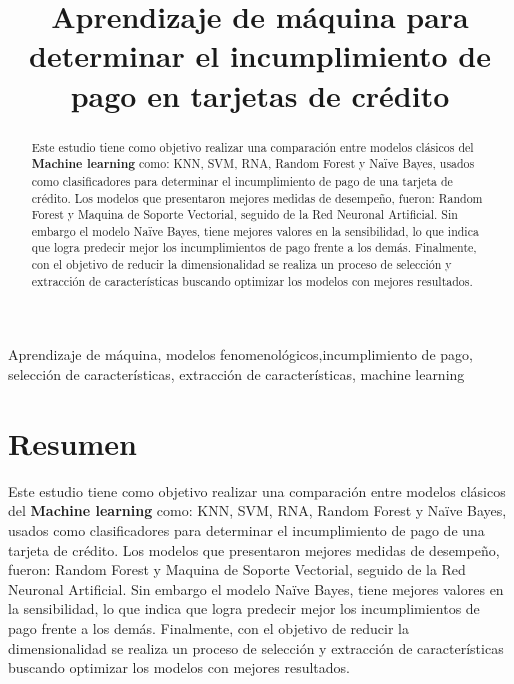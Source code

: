 \documentclass[conference]{IEEEtran}
\begin{document}
\title{Aprendizaje de máquina para determinar el incumplimiento de pago en tarjetas de crédito
}
\author{
\and
{}
}

\maketitle

\begin{abstract}
Este estudio tiene como objetivo realizar una comparación entre modelos clásicos del \textbf{Machine learning} como: KNN, SVM, RNA, Random Forest y Naïve Bayes, usados como clasificadores para determinar el incumplimiento de pago de una tarjeta de crédito. 
Los modelos que presentaron mejores medidas de desempeño, fueron: Random Forest y Maquina de Soporte Vectorial, seguido de la Red Neuronal Artificial. Sin embargo el modelo Naïve Bayes, tiene mejores valores en la sensibilidad, lo que indica que logra predecir mejor los incumplimientos de pago frente a los demás. Finalmente, con el objetivo de reducir la dimensionalidad se realiza un proceso de selección y extracción de características buscando optimizar los modelos con mejores resultados.
\end{abstract}

\hfill
 
\begin{IEEEkeywords}
Aprendizaje de máquina, modelos fenomenológicos,incumplimiento de pago, selección de características, extracción de características, machine learning
\end{IEEEkeywords}

\section{Resumen}
Este estudio tiene como objetivo realizar una comparación entre modelos clásicos del \textbf{Machine learning} como: KNN, SVM, RNA, Random Forest y Naïve Bayes, usados como clasificadores para determinar el incumplimiento de pago de una tarjeta de crédito. 
Los modelos que presentaron mejores medidas de desempeño, fueron: Random Forest y Maquina de Soporte Vectorial, seguido de la Red Neuronal Artificial. Sin embargo el modelo Naïve Bayes, tiene mejores valores en la sensibilidad, lo que indica que logra predecir mejor los incumplimientos de pago frente a los demás. Finalmente, con el objetivo de reducir la dimensionalidad se realiza un proceso de selección y extracción de características buscando optimizar los modelos con mejores resultados.
\end{document}
